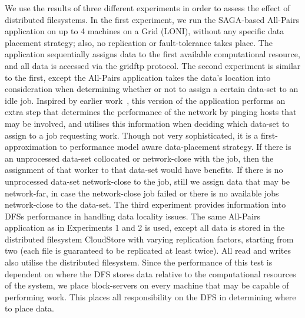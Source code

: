 \documentclass[a4paper,11pt]{article}
\begin{document}
We use the results of three different experiments in order to assess the
effect of distributed filesystems. In the first experiment, we run the
SAGA-based All-Pairs application on up to 4 machines on a Grid (LONI),
without any specific data placement strategy; also, no replication or
fault-tolerance takes place. The application sequentially assigns data
to the first available computational resource, and all data is accessed
via the gridftp protocol. The second experiment is similar to the first,
except the All-Pairs application takes the data's location into
consideration when determining whether or not to assign a certain
data-set to an idle job. Inspired by earlier work~\cite{netperf}, this
version of the application performs an extra step that determines the
performance of the network by pinging hosts that may be involved, and
utilises this information when deciding which data-set to assign to a
job requesting work. Though not very sophisticated, it is a
first-approximation to performance model aware data-placement strategy.
If there is an unprocessed data-set collocated or network-close with the
job, then the assignment of that worker to that data-set would have
benefits. If there is no unprocessed data-set network-close to the job,
still we assign data that may be network-far, in case the network-close
job failed or there is no available jobs network-close to the data-set.
The third experiment provides information into DFSs performance in
handling data locality issues. The same All-Pairs application as in
Experiments 1 and 2 is used, except all data is stored in the
distributed filesystem CloudStore with varying replication factors,
starting from two (each file is guaranteed to be replicated at least
twice). All read and writes also utilise the distributed filesystem.
Since the performance of this test is dependent on where the DFS stores
data relative to the computational resources of the system, we place
block-servers on every machine that may be capable of performing work.
This places all responsibility on the DFS in determining where to place
data.
\end{document}
